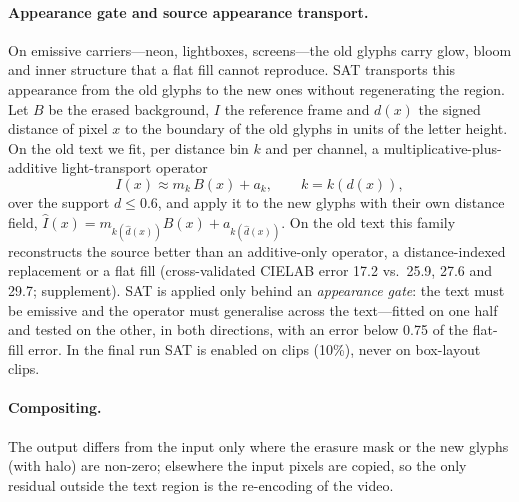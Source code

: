 \paragraph{Appearance gate and source appearance transport.}
\label{sec:sat}
On emissive carriers---neon, lightboxes, screens---the old glyphs carry glow, bloom and inner structure that a flat fill cannot reproduce. SAT transports this appearance from the old glyphs to the new ones without regenerating the region. Let $B$ be the erased background, $I$ the reference frame and $d(x)$ the signed distance of pixel $x$ to the boundary of the old glyphs in units of the letter height. On the old text we fit, per distance bin $k$ and per channel, a multiplicative-plus-additive light-transport operator
\begin{equation}
I(x)\approx m_k\,B(x)+a_k,\qquad k=k(d(x)),
\label{eq:sat}
\end{equation}
over the support $d\le0.6$, and apply it to the new glyphs with their own distance field, $\hat I(x)=m_{k(\hat d(x))}B(x)+a_{k(\hat d(x))}$. On the old text this family reconstructs the source better than an additive-only operator, a distance-indexed replacement or a flat fill (cross-validated CIELAB error 17.2 vs.\ 25.9, 27.6 and 29.7; supplement). SAT is applied only behind an \emph{appearance gate}: the text must be emissive and the operator must generalise across the text---fitted on one half and tested on the other, in both directions, with an error below 0.75 of the flat-fill error. In the final run SAT is enabled on \rSatOn{} clips (10\%), never on box-layout clips.

\paragraph{Compositing.} The output differs from the input only where the erasure mask or the new glyphs (with halo) are non-zero; elsewhere the input pixels are copied, so the only residual outside the text region is the re-encoding of the video.

